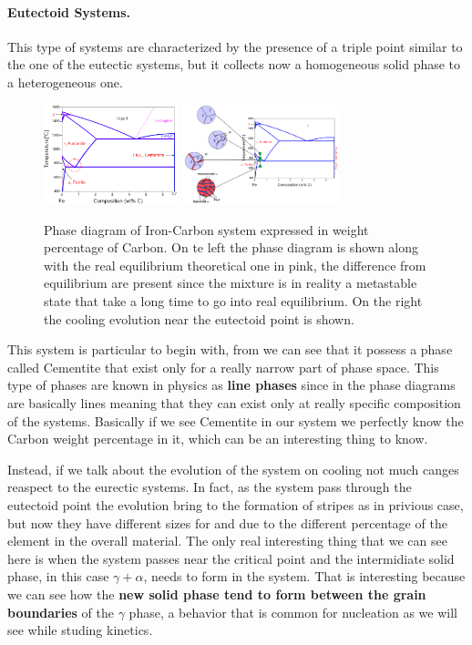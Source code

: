\paragraph{Eutectoid Systems.} This type of systems are characterized by the presence of a triple point similar to the one of the eutectic systems, but it collects now a homogeneous solid phase to a heterogeneous one. 
\begin{figure}[b]
    \centering
    \includegraphics[width=0.35\textwidth]{Immagini/Fe-C.png}
    \includegraphics[width=0.4\textwidth]{Immagini/Fe-CEvo.png}
    \caption
    {
        Phase diagram of Iron-Carbon system expressed in weight percentage of Carbon. On te left the phase diagram is shown along with the real equilibrium theoretical one in pink, the difference from equilibrium are present since the mixture is in reality a metastable state that take a long time to go into real equilibrium. On the right the cooling evolution near the eutectoid point is shown. 
    }
    \label{fig:Fe-C}
\end{figure}
This system is particular to begin with, from  we can see that it possess a phase called Cementite that exist only for a really narrow part of phase space. This type of phases are known in physics as \textbf{line phases} since in the phase diagrams are basically lines meaning that they can exist only at really specific composition of the systems. Basically if we see Cementite in our system we perfectly know the Carbon weight percentage in it, which can be an interesting thing to know.

Instead, if we talk about the evolution of the system on cooling not much canges reaspect to the eurectic systems. In fact, as the system pass through the eutectoid point the evolution bring to the formation of stripes as in privious case, but now they have different sizes for  and  due to the different percentage of the element in the overall material. The only real interesting thing that we can see here is when the system passes near the critical point and the intermidiate solid phase, in this case $\gamma + \alpha$, needs to form in the system. That is interesting because we can see how the \textbf{new solid phase tend to form between the grain boundaries} of the $\gamma$ phase, a behavior that is common for nucleation as we will see while studing kinetics.

